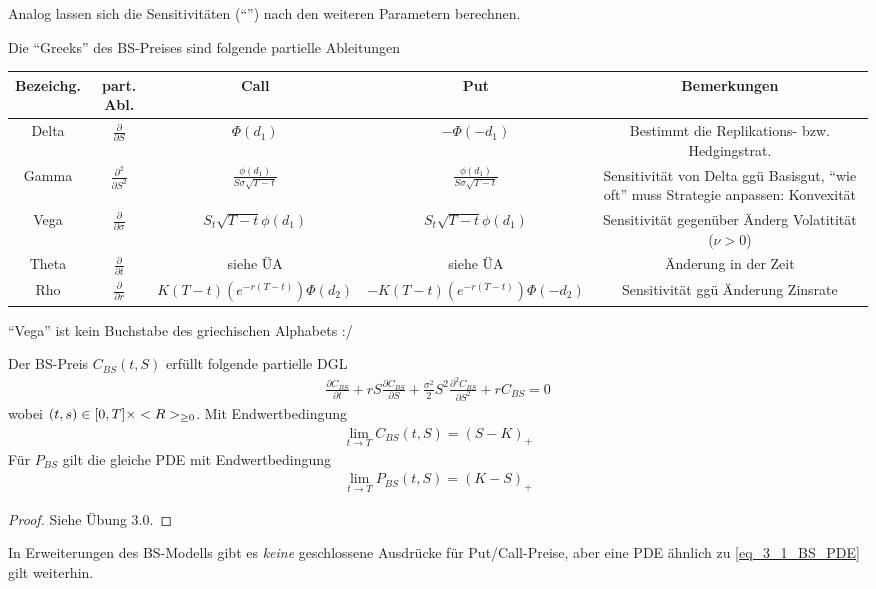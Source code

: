 Analog lassen sich die Sensitivitäten (``'') nach den weiteren Parametern berechnen.
\begin{definition}
	Die ``Greeks'' des BS-Preises sind folgende partielle Ableitungen\\
	\begin{tabular}{|c|c|c|c|c|} %
		Bezeichg. & part. Abl. & Call & Put & Bemerkungen\\
		\hline
		Delta & $\frac{\partial}{\partial S}$ & $\Phi(d_1)$ & $-\Phi(-d_1)$ & Bestimmt die Replikations- bzw. Hedgingstrat.\\
		Gamma & $\frac{\partial^2}{\partial S^2}$ & $\frac{\phi(d_1)}{S\sigma\sqrt{T-t}}$ & $\frac{\phi(d_1)}{S\sigma\sqrt{T-t}}$ & Sensitivität von Delta ggü Basisgut, ``wie oft'' muss Strategie anpassen: Konvexität\\
		Vega & $\frac{\partial}{\partial \sigma}$ & $S_t \sqrt{T-t}\phi(d_1)$ & $S_t \sqrt{T-t}\phi(d_1)$ & Sensitivität gegenüber Änderg Volatitität ($\nu >0$)\\
		Theta & $\frac{\partial}{\partial t}$ & siehe ÜA & siehe ÜA & Änderung in der Zeit\\
		Rho & $\frac{\partial}{\partial r}$ & $K(T-t)(e^{-r(T-t)}) \Phi(d_2)$ & $-K(T-t)(e^{-r(T-t)}) \Phi(-d_2)$ & Sensitivität ggü Änderung Zinsrate
	\end{tabular}
\end{definition}
\begin{*remark}
	``Vega'' ist kein Buchstabe des griechischen Alphabets :/
\end{*remark}
\begin{conclusion}
	Der BS-Preis $C_{BS}(t,S)$ erfüllt folgende partielle DGL
	\begin{align*}
		\frac{\partial C_{BS}}{\partial t} + rS\frac{\partial C_{BS}}{\partial S} + \frac{\sigma^2}{2}S^2 \frac{\partial^2 C_{BS}}{\partial S^2}+rC_{BS} = 0 \tag{BS-PDE}\label{eq_3_1_BS_PDE}
	\end{align*}
	wobei $(t,s) \in [0,T]\times <R>_{\ge 0}$. Mit Endwertbedingung
	\begin{align*}
		\lim_{t \to T} C_{BS}(t,S) = (S-K)_+
	\end{align*}
	Für $P_{BS}$ gilt die gleiche PDE mit Endwertbedingung
	\begin{align*}
		\lim_{t \to T} P_{BS}(t,S) = (K-S)_+
	\end{align*}
\end{conclusion}
\begin{proof}
	Siehe Übung 3.0.
\end{proof}
\begin{*remark}
	In Erweiterungen des BS-Modells gibt es \emph{keine} geschlossene Ausdrücke für Put/Call-Preise, aber eine PDE ähnlich zu \eqref{eq_3_1_BS_PDE} gilt weiterhin.
\end{*remark}
